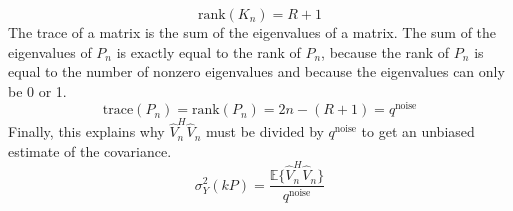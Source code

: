 \begin{equation*}
    \text{rank}(K_n) = R + 1
\end{equation*}
The trace of a matrix is the sum of the eigenvalues of a matrix. The sum of the eigenvalues of $P_n$ is exactly equal to the rank of $P_n$, because the rank of $P_n$ is equal to the number of nonzero eigenvalues and because the eigenvalues can only be 0 or 1.
\begin{equation*}
    \text{trace}(P_n) = \text{rank}(P_n) = 2n - (R + 1) = q^{\text{noise}}
\end{equation*}
Finally, this explains why $\hat V_n^H \hat V_n$ must be divided by $q^{\text{noise}}$ to get an unbiased estimate of the covariance.
\begin{equation*}
\boxed{
     \sigma_Y^2(kP) = \frac{\mathbb{E}\{\hat V_n^H \hat V_n\}}{q^{\text{noise}}}
     }
\end{equation*}




